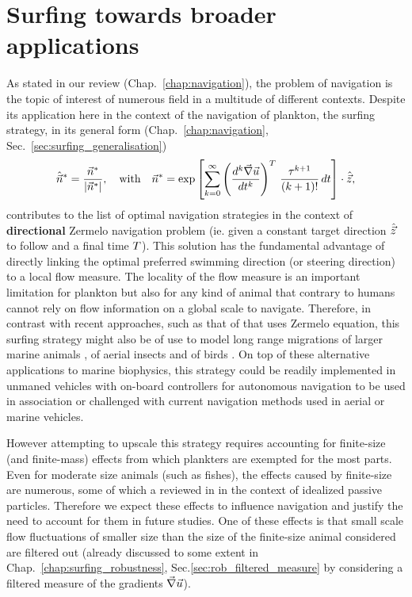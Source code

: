 \section{Surfing towards broader applications}

As stated in our review (Chap.~\ref{chap:navigation}), the problem of navigation is the topic of interest of numerous field in a multitude of different contexts.
Despite its application here in the context of the navigation of plankton, the surfing strategy, in its general form (Chap.~\ref{chap:navigation}, Sec.~\ref{sec:surfing_generalisation})
\begin{equation}
	\hat{\vec{n}}^* = \frac{\vec{n}^*}{\lvert\vec{n}^*\rvert}, \quad \text{with} \quad \vec{n}^* = \exp \left[ \sum_{k=0}^\infty \left( \frac{d^k \vec{\nabla} \vec{u}}{dt^k} \right)^T \, \frac{\tau^{k+1}}{(k+1)!} \, dt \right] \cdot \hat{\vec{z}},
\end{equation}
contributes to the list of optimal navigation strategies in the context of \textbf{directional} Zermelo navigation problem (ie. given a constant target direction $\hat{\vec{z}}$ to follow and a final time $T$).
This solution has the fundamental advantage of directly linking the optimal preferred swimming direction (or steering direction) to a local flow measure.
The locality of the flow measure is an important limitation for plankton but also for any kind of animal that contrary to humans cannot rely on flow information on a global scale to navigate.
Therefore, in contrast with recent approaches, such as that of \citet{hays2014route} that uses Zermelo equation, this surfing strategy might also be of use to model long range migrations of larger marine animals \citep{fossette2015current, putman2014inherited, luschi2013long, hays2014route}, of aerial insects \citep{chapman2015long} and of birds \citep{wehner2001bird}.
On top of these alternative applications to marine biophysics, this strategy could be readily implemented in unmaned vehicles with on-board controllers for autonomous navigation to be used in association or challenged with current navigation methods used in aerial \citep{reddy2018glider} or marine \citep{tranzatto2015navigation} vehicles.

However attempting to upscale this strategy requires accounting for finite-size (and finite-mass) effects from which plankters are exempted for the most parts.
Even for moderate size animals (such as fishes), the effects caused by finite-size are numerous, some of which a reviewed in \citet{brandt2022particle} in the context of idealized passive particles.
Therefore we expect these effects to influence navigation and justify the need to account for them in future studies.
One of these effects is that small scale flow fluctuations of smaller size than the size of the finite-size animal considered are filtered out (already discussed to some extent in Chap.~\ref{chap:surfing_robustness}, Sec.\ref{sec:rob_filtered_measure} by considering a filtered measure of the gradients $\vec{\nabla} \vec{u}$).

